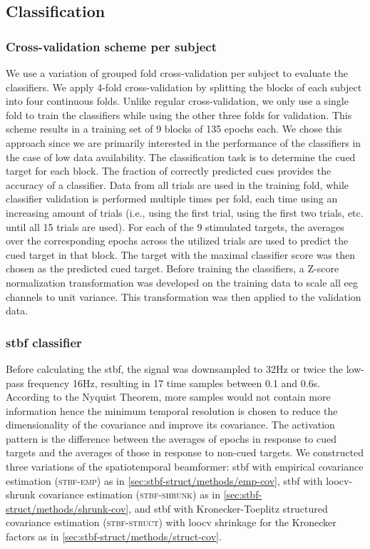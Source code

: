 	\subsection{Classification}
	\subsubsection{Cross-validation scheme per subject}
	We use a variation of grouped fold cross-validation per subject to evaluate the classifiers.
	We apply 4-fold cross-validation by splitting the blocks of each subject into
	four continuous folds.
	Unlike regular cross-validation, we only use a single fold to train the
	classifiers while using the other three folds for validation.
	This scheme results in a training set of 9 blocks of 135 epochs each.
	We chose this approach since we are primarily interested in the performance of the classifiers in the case of low data availability.
	The classification task is to determine the cued target for each block.
	The fraction of correctly predicted cues provides the accuracy of a classifier.
	Data from all trials are used in the training fold, while classifier validation
	is performed multiple times per fold, each time using an increasing amount of
	trials (i.e., using the first trial, using the first two trials, etc. until all 15 trials
	are used).
	For each of the 9 stimulated targets, the averages over the corresponding epochs across
	the utilized trials are used to predict the cued target in that block.
	The target with the maximal classifier score was then chosen as the predicted
	cued target.
	Before training the classifiers, a Z-score normalization transformation was
	developed on the training data to scale all \ac{eeg} channels to unit variance.
	This transformation was then applied to the validation data.

  \subsubsection{\Acl{stbf} classifier}
	Before calculating the \ac{stbf}, the signal was downsampled to
	32Hz or twice the low-pass frequency 16Hz, resulting in 17 time samples
	between 0.1 and 0.6s. According to the Nyquist Theorem, more samples would not
	contain more information hence the minimum temporal resolution is chosen to reduce
	the dimensionality of the covariance and improve its covariance.
	The activation pattern is the difference between the averages of epochs in response to cued targets and the averages of those in response to non-cued targets.
	We constructed three variations of the spatiotemporal beamformer:
	\ac{stbf} with empirical covariance estimation (\textsc{stbf-emp}) as in
	\cref{sec:stbf-struct/methods/emp-cov}, \ac{stbf} with
	\ac{loocv}-shrunk covariance estimation (\textsc{stbf-shrunk}) as in
	\cref{sec:stbf-struct/methods/shrunk-cov}, and \ac{stbf} with
	Kronecker-Toeplitz structured covariance estimation (\textsc{stbf-struct}) with \ac{loocv} shrinkage for
	the Kronecker factors as in \cref{sec:stbf-struct/methods/struct-cov}.

